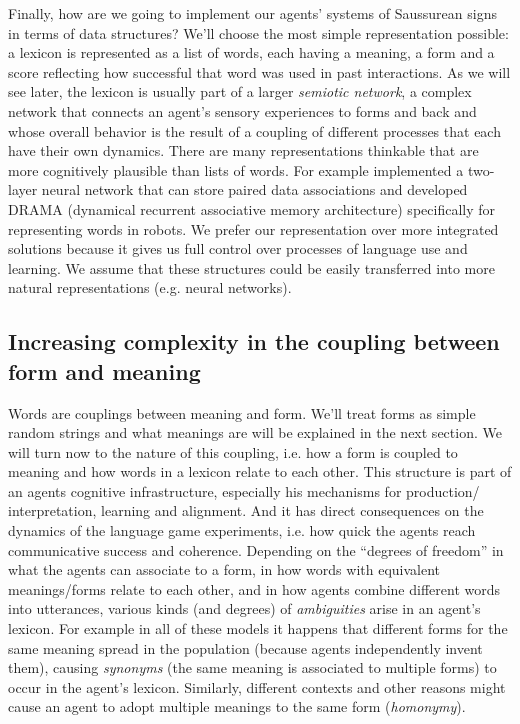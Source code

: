 Finally, how are we going to implement our agents' systems of
Saussurean signs in terms of data structures? We'll choose the most
simple representation possible: a lexicon is represented as a list of
words, each having a meaning, a form and a score reflecting how
successful that word was used in past interactions. As we will see
later, the lexicon is usually part of a larger \emph{semiotic
  network}, a complex network \citep{strogatz01exploring} that
connects an agent's sensory experiences to forms and back and whose
overall behavior is the result of a coupling of different processes
that each have their own dynamics. There are many representations
thinkable that are more cognitively plausible than lists of words. For
example \cite{kosko88bidirectional} implemented a two-layer neural
network that can store paired data associations and
\cite*{billard99drama} developed DRAMA (dynamical recurrent
associative memory architecture) specifically for representing words
in robots. We prefer our representation over more integrated solutions
because it gives us full control over processes of language use and
learning. We assume that these structures could be easily transferred
into more natural representations (e.g. neural networks).


\subsection{Increasing complexity in the coupling between form and
  meaning}
\label{s:nature-of-form-meaning-couplings}


Words are couplings between meaning and form. We'll treat forms as
simple random strings and what meanings are will be explained in the
next section. We will turn now to the nature of this coupling, i.e.
how a form is coupled to meaning and how words in a lexicon relate to
each other. This structure is part of an agents cognitive
infrastructure, especially his mechanisms for production/
interpretation, learning and alignment. And it has direct consequences
on the dynamics of the language game experiments, i.e. how quick the
agents reach communicative success and coherence. Depending on the
``degrees of freedom'' in what the agents can associate to a form, in
how words with equivalent meanings/forms relate to each other, and in
how agents combine different words into utterances, various kinds (and
degrees) of \emph{ambiguities} arise in an agent's lexicon. For
example in all of these models it happens that different forms for the
same meaning spread in the population (because agents independently
invent them), causing \emph{synonyms} (the same meaning is associated
to multiple forms) to occur in the agent's lexicon. Similarly,
different contexts and other reasons might cause an agent to adopt
multiple meanings to the same form (\emph{homonymy}).

